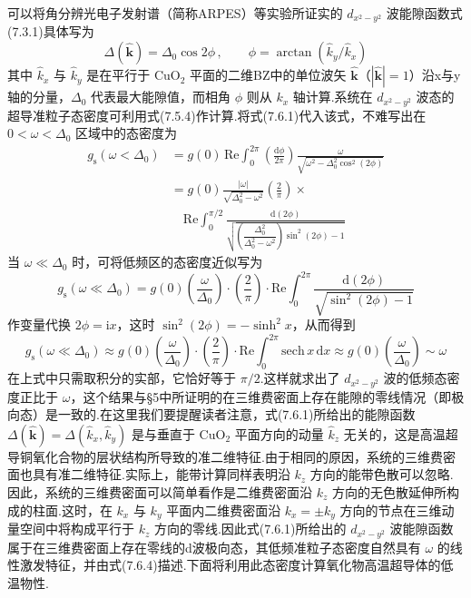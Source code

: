 可以将角分辨光电子发射谱（简称ARPES）等实验所证实的 $d_{x^{2}-y^{2}}$ 波能隙函数式(7.3.1)具体写为
\begin{equation}
  \Delta(\hat{\boldsymbol{k}})=\Delta_{0}\cos2\phi\,,\qquad
  \phi=\arctan\left(\hat{k}_{y}/\hat{k}_{x}\right)
\end{equation}
其中 $\hat{k}_{x}$ 与 $\hat{k}_{y}$ 是在平行于 $\mathrm{CuO}_{2}$ 平面的二维BZ中的单位波矢 $\hat{\boldsymbol{k}}$（$\left|\hat{\boldsymbol{k}}\right|=1$）沿x与y轴的分量，$\Delta_{0}$ 代表最大能隙值，而相角 $\phi$ 则从 $k_{x}$ 轴计算.系统在 $d_{x^{2}-y^{2}}$ 波态的超导准粒子态密度可利用式(7.5.4)作计算.将式(7.6.1)代入该式，不难写出在 $0<\omega<\Delta_{0}$ 区域中的态密度为
\begin{equation}
\begin{aligned}
  g_{\mathrm{s}}\left(\omega<\Delta_{0}\right)
  &=g(0)\,\mathrm{Re}\int_{0}^{2\pi}\left(\frac{\mathrm{d}\phi}{2\pi}\right)
  \frac{\omega}{\sqrt{\omega^{2}-\Delta_{0}^{2}\cos^{2}(2\phi)}}\\
  &=g(0)\frac{\left|\omega\right|}{\sqrt{\Delta_{0}^{2}-\omega^{2}}}\left(\frac{2}{\pi}\right)\times\\
  &\quad\mathrm{Re}\int_{0}^{\pi/2}\frac{\mathrm{d}\left(2\phi\right)}
  {\sqrt{\left(\dfrac{\Delta_{0}^{2}}{\Delta_{0}^{2}-\omega^{2}}\right)\sin^{2}(2\phi)-1}}
\end{aligned}
\end{equation}
当 $\omega\ll\Delta_{0}$ 时，可将低频区的态密度近似写为
\begin{equation}
  g_{\mathrm{s}}\left(\omega\ll\Delta_{0}\right)=g(0)\left(\frac{\omega}{\Delta_{0}}\right)\cdot\left(\frac{2}{\pi}\right)\cdot
  \mathrm{Re}\int_{0}^{2\pi}\frac{\mathrm{d}\left(2\phi\right)}{\sqrt{\sin^{2}(2\phi)-1}}
\end{equation}
作变量代换 $2\phi=\mathrm{i}x$，这时 $\sin^{2}(2\phi)=-\sinh^{2}x$，从而得到
\begin{equation}
  g_{\mathrm{s}}\left(\omega\ll\Delta_{0}\right)\approx g(0)\left(\frac{\omega}{\Delta_{0}}\right)\cdot\left(\frac{2}{\pi}\right)\cdot
  \mathrm{Re}\int_{0}^{2\pi}\mathrm{sech}\,x\,\mathrm{d}x\approx g(0)\left(\frac{\omega}{\Delta_{0}}\right)\sim\omega
\end{equation}
在上式中只需取积分的实部，它恰好等于 $\pi/2$.这样就求出了 $d_{x^{2}-y^{2}}$ 波的低频态密度正比于 $\omega$，这个结果与§5中所证明的在三维费密面上存在能隙的零线情况（即极向态）是一致的.在这里我们要提醒读者注意，式(7.6.1)所给出的能隙函数 $\Delta(\hat{\boldsymbol{k}})=\Delta\left(\hat{k}_{x},\hat{k}_{y}\right)$ 是与垂直于 $\mathrm{CuO}_{2}$ 平面方向的动量 $\hat{k}_{z}$ 无关的，这是高温超导铜氧化合物的层状结构所导致的准二维特征.由于相同的原因，系统的三维费密面也具有准二维特征.实际上，能带计算同样表明沿 $k_{z}$ 方向的能带色散可以忽略.因此，系统的三维费密面可以简单看作是二维费密面沿 $k_{z}$ 方向的无色散延伸所构成的柱面.这时，在 $k_{x}$ 与 $k_{y}$ 平面内二维费密面沿 $k_{x}=\pm k_{y}$ 方向的节点在三维动量空间中将构成平行于 $k_{z}$ 方向的零线.因此式(7.6.1)所给出的 $d_{x^{2}-y^{2}}$ 波能隙函数属于在三维费密面上存在零线的d波极向态，其低频准粒子态密度自然具有 $\omega$ 的线性激发特征，并由式(7.6.4)描述.下面将利用此态密度计算氧化物高温超导体的低温物性.

